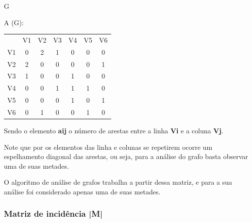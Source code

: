 \documentclass[a4paper, 12pt]{article}
\begin{document}
    \begin{multicols}{2}
        \begin{center}
        G\:
        \end{center}
        
        \begin{center}
        A (G):
        \end{center}
        \begin{tabular}{ccccccc}
                & V1 & V2 & V3 & V4 & V5 & V6 \\
                V1 & 0  & 2  & 1  & 0  & 0  & 0  \\
                V2 & 2  & 0  & 0  & 0  & 0  & 1  \\
                V3 & 1  & 0  & 0  & 1  & 0  & 0  \\
                V4 & 0  & 0  & 1  & 1  & 1  & 0  \\
                V5 & 0  & 0  & 0  & 1  & 0  & 1  \\
                V6 & 0  & 1  & 0  & 0  & 1  & 0 
        \end{tabular}
    \end{multicols}
    
    \vspace{0.5in}
    
    Sendo o elemento \textbf{aij} o número de arestas entre a linha \textbf{Vi} e a coluna \textbf{Vj}. 
    
    \indent Note que por os elementos das linha e colunas se repetirem ocorre um espelhamento diagonal das arestas, ou seja, para a análise do grafo basta observar uma de suas metades. 

    \indent O algoritmo de análise de grafos trabalha a partir dessa matriz, e para a sua análise foi considerado apenas uma de suas metades.
    
\subsubsection{Matriz de incidência |M|}
\end{document}
